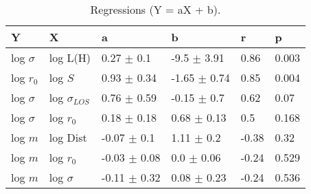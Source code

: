 \begin{table}
\centering
\caption{Regressions (Y = aX + b).}
\begin{tabular}{llllll}
\toprule
            Y &                   X &                 a &                 b &      r &      p \\
\midrule
 log $\sigma$ &            log L(H) &    0.27 $\pm$ 0.1 &   -9.5 $\pm$ 3.91 &   0.86 &  0.003 \\
    log $r_0$ &             log $S$ &   0.93 $\pm$ 0.34 &  -1.65 $\pm$ 0.74 &   0.85 &  0.004 \\
 log $\sigma$ &  log $\sigma_{LOS}$ &   0.76 $\pm$ 0.59 &   -0.15 $\pm$ 0.7 &   0.62 &   0.07 \\
 log $\sigma$ &         log $r_{0}$ &   0.18 $\pm$ 0.18 &   0.68 $\pm$ 0.13 &    0.5 &  0.168 \\
      log $m$ &            log Dist &   -0.07 $\pm$ 0.1 &    1.11 $\pm$ 0.2 &  -0.38 &   0.32 \\
      log $m$ &         log $r_{0}$ &  -0.03 $\pm$ 0.08 &    0.0 $\pm$ 0.06 &  -0.24 &  0.529 \\
      log $m$ &        log $\sigma$ &  -0.11 $\pm$ 0.32 &   0.08 $\pm$ 0.23 &  -0.24 &  0.536 \\
\bottomrule
\end{tabular}
\end{table}
